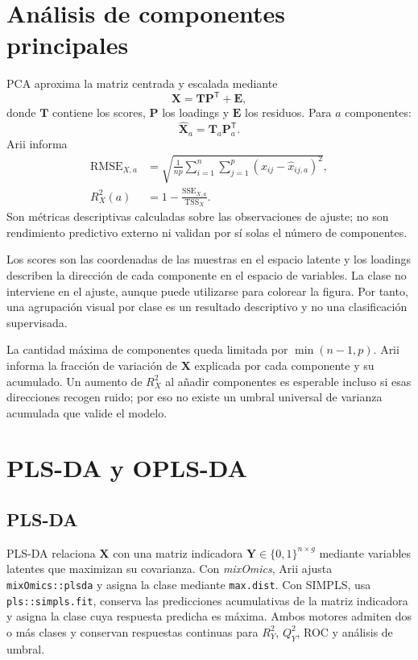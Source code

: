 \documentclass[11pt,a4paper,openany]{report}
\newcommand{\mixOmics}{\textit{mixOmics}}
\newcommand{\code}[1]{\texttt{#1}}
\newcommand{\RtwoX}{R^{2}_{X}}
\newcommand{\RtwoY}{R^{2}_{Y}}
\newcommand{\QtwoY}{Q^{2}_{Y}}
\newcommand{\vect}[1]{\boldsymbol{#1}}
\begin{document}
\chapter{Análisis de componentes principales}
PCA aproxima la matriz centrada y escalada mediante
\begin{equation}
  \vect{X}=\vect{T}\vect{P}^{\mathsf T}+\vect{E},
\end{equation}
donde $\vect{T}$ contiene los scores, $\vect{P}$ los loadings y $\vect{E}$ los residuos. Para $a$ componentes:
\begin{equation}
  \widehat{\vect{X}}_{a}=\vect{T}_{a}\vect{P}_{a}^{\mathsf T}.
\end{equation}
Arii informa
\begin{align}
  \mathrm{RMSE}_{X,a} &= \sqrt{\frac{1}{np}\sum_{i=1}^{n}\sum_{j=1}^{p}
    \left(x_{ij}-\widehat{x}_{ij,a}\right)^2}, \\
  \RtwoX(a) &= 1-\frac{\mathrm{SSE}_{X,a}}{\mathrm{TSS}_{X}}.
\end{align}
Son métricas descriptivas calculadas sobre las observaciones de ajuste; no son rendimiento predictivo externo ni validan por sí solas el número de componentes.

Los scores son las coordenadas de las muestras en el espacio latente y los loadings describen la dirección de cada componente en el espacio de variables.
La clase no interviene en el ajuste, aunque puede utilizarse para colorear la figura. Por tanto, una agrupación visual por clase es un resultado descriptivo y no una clasificación supervisada.

La cantidad máxima de componentes queda limitada por $\min(n-1,p)$. Arii informa la fracción de variación de $\vect{X}$ explicada por cada componente y su acumulado. Un aumento de $\RtwoX$ al añadir componentes es esperable incluso si esas direcciones recogen ruido; por eso no existe un umbral universal de varianza acumulada que valide el modelo.

\chapter{PLS-DA y OPLS-DA}
\section{PLS-DA}
PLS-DA relaciona $\vect{X}$ con una matriz indicadora $\vect{Y}\in\{0,1\}^{n\times g}$ mediante variables latentes que maximizan su covarianza. Con \mixOmics, Arii ajusta \code{mixOmics::plsda} y asigna la clase mediante \code{max.dist}. Con SIMPLS, usa \code{pls::simpls.fit}, conserva las predicciones acumulativas de la matriz indicadora y asigna la clase cuya respuesta predicha es máxima. Ambos motores admiten dos o más clases y conservan respuestas continuas para $\RtwoY$, $\QtwoY$, ROC y análisis de umbral.
\end{document}
